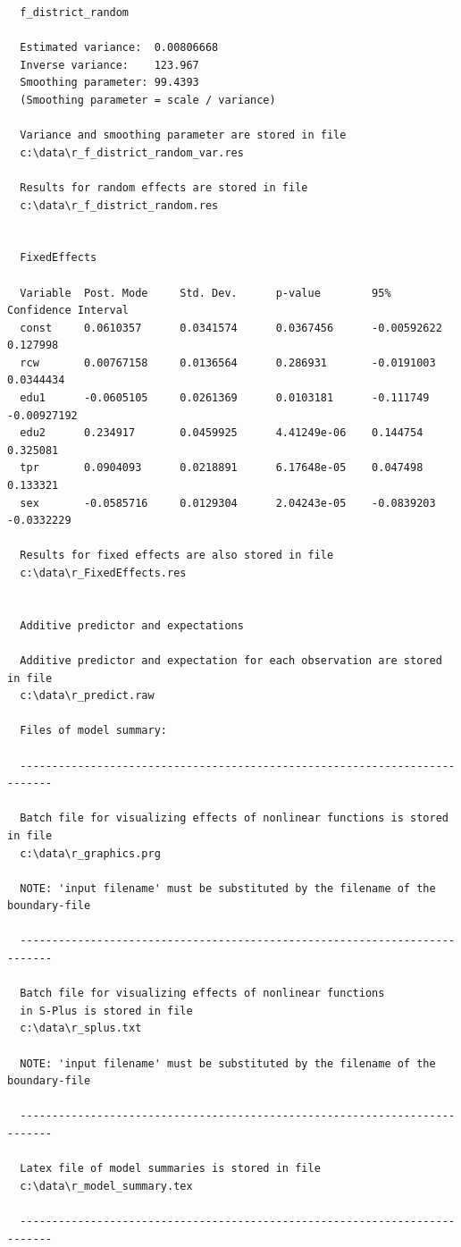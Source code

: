 \documentclass[a4paper]{article}
\begin{document}
\begin{verbatim}
  f_district_random

  Estimated variance:  0.00806668
  Inverse variance:    123.967
  Smoothing parameter: 99.4393
  (Smoothing parameter = scale / variance)

  Variance and smoothing parameter are stored in file
  c:\data\r_f_district_random_var.res

  Results for random effects are stored in file
  c:\data\r_f_district_random.res


  FixedEffects

  Variable  Post. Mode     Std. Dev.      p-value        95% Confidence Interval
  const     0.0610357      0.0341574      0.0367456      -0.00592622    0.127998
  rcw       0.00767158     0.0136564      0.286931       -0.0191003     0.0344434
  edu1      -0.0605105     0.0261369      0.0103181      -0.111749      -0.00927192
  edu2      0.234917       0.0459925      4.41249e-06    0.144754       0.325081
  tpr       0.0904093      0.0218891      6.17648e-05    0.047498       0.133321
  sex       -0.0585716     0.0129304      2.04243e-05    -0.0839203     -0.0332229

  Results for fixed effects are also stored in file
  c:\data\r_FixedEffects.res


  Additive predictor and expectations

  Additive predictor and expectation for each observation are stored in file
  c:\data\r_predict.raw

  Files of model summary:

  ---------------------------------------------------------------------------

  Batch file for visualizing effects of nonlinear functions is stored in file
  c:\data\r_graphics.prg

  NOTE: 'input filename' must be substituted by the filename of the boundary-file

  ---------------------------------------------------------------------------

  Batch file for visualizing effects of nonlinear functions
  in S-Plus is stored in file
  c:\data\r_splus.txt

  NOTE: 'input filename' must be substituted by the filename of the boundary-file

  ---------------------------------------------------------------------------

  Latex file of model summaries is stored in file
  c:\data\r_model_summary.tex

  ---------------------------------------------------------------------------
\end{verbatim}
\normalsize
\end{document}
